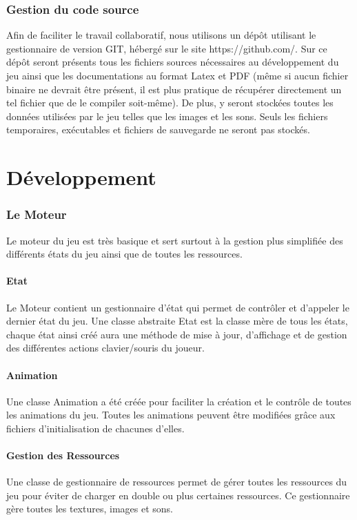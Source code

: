 \documentclass[a4paper]{article}
\newcommand{\alinea}{\hspace*{0.5cm}}
\begin{document}
    \section{Gestion du code source}
      \alinea Afin de faciliter le travail collaboratif, nous utilisons un dépôt utilisant le gestionnaire de version GIT, hébergé sur le site https://github.com/. Sur ce dépôt seront présents tous les fichiers sources nécessaires au développement du jeu ainsi que les documentations au format Latex et PDF (même si aucun fichier binaire ne devrait être présent, il est plus pratique de récupérer directement un tel fichier que de le compiler soit-même). De plus, y seront stockées toutes les données utilisées par le jeu telles que les images et les sons. Seuls les fichiers temporaires, exécutables et fichiers de sauvegarde ne seront pas stockés.
		
\newpage
  \part{Développement}
    \section{Le Moteur}
      \alinea Le moteur du jeu est très basique et sert surtout à la gestion plus simplifiée des différents états du jeu ainsi que de toutes les ressources.
      
      \subsection{Etat}
        \alinea Le Moteur contient un gestionnaire d'état qui permet de contrôler et d'appeler le dernier état du jeu. Une classe abstraite Etat est la classe mère de tous les états, chaque état ainsi créé aura une méthode de mise à jour, d'affichage et de gestion des différentes actions clavier/souris du joueur.
        
      \subsection{Animation}
        \alinea Une classe Animation a été créée pour faciliter la création et le contrôle de toutes les animations du jeu. Toutes les animations peuvent être modifiées grâce aux fichiers d'initialisation de chacunes d'elles.
        
      \subsection{Gestion des Ressources}
        \alinea Une classe de gestionnaire de ressources permet de gérer toutes les ressources du jeu pour éviter de charger en double ou plus certaines ressources. Ce gestionnaire gère toutes les textures, images et sons.
\end{document}
